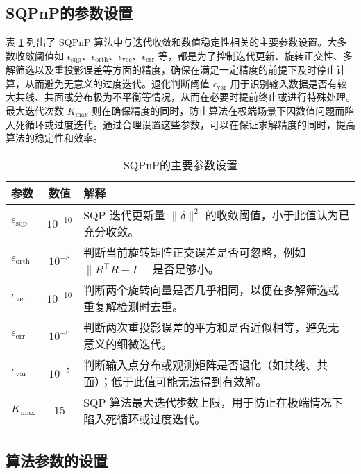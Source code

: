 \subsection{SQPnP的参数设置}
表 \ref{tab:sqpnp-params} 列出了 SQPnP 算法中与迭代收敛和数值稳定性相关的主要参数设置。大多数收敛阈值如 \(\epsilon_{\mathrm{sqp}}\)、\(\epsilon_{\mathrm{orth}}\)、\(\epsilon_{\mathrm{vec}}\)、\(\epsilon_{\mathrm{err}}\) 等，都是为了控制迭代更新、旋转正交性、多解筛选以及重投影误差等方面的精度，确保在满足一定精度的前提下及时停止计算，从而避免无意义的过度迭代。退化判断阈值 \(\epsilon_{\mathrm{var}}\) 用于识别输入数据是否有较大共线、共面或分布极为不平衡等情况，从而在必要时提前终止或进行特殊处理。最大迭代次数 \(K_{\mathrm{max}}\) 则在确保精度的同时，防止算法在极端场景下因数值问题而陷入死循环或过度迭代。通过合理设置这些参数，可以在保证求解精度的同时，提高算法的稳定性和效率。
\begin{table}[htbp]
	\centering
	\caption{SQPnP的主要参数设置}
	\label{tab:sqpnp-params}
	\begin{tabular}{l c p{7.5cm}}
		\toprule
		参数 & 数值 & 解释 \\
		\midrule
		
		$\epsilon_{\mathrm{sqp}}$      & $10^{-10}$ & 
		SQP 迭代更新量 $\|\delta\|^2$ 的收敛阈值，小于此值认为已充分收敛。\\[3pt]
		
		$\epsilon_{\mathrm{orth}}$     & $10^{-8}$  & 
		判断当前旋转矩阵正交误差是否可忽略，例如 $\|R^\top R - I\|$ 是否足够小。\\[3pt]
		
		$\epsilon_{\mathrm{vec}}$      & $10^{-10}$ &
		判断两个旋转向量是否几乎相同，以便在多解筛选或重复解检测时去重。\\[3pt]
		
		$\epsilon_{\mathrm{err}}$      & $10^{-6}$  &
		判断两次重投影误差的平方和是否近似相等，避免无意义的细微迭代。\\[3pt]
		
		$\epsilon_{\mathrm{var}}$      & $10^{-5}$  &
		判断输入点分布或观测矩阵是否退化（如共线、共面）；低于此值可能无法得到有效解。\\[3pt]
		
		$K_{\mathrm{max}}$             & 15         &
		SQP 算法最大迭代步数上限，用于防止在极端情况下陷入死循环或过度迭代。\\
		\bottomrule
	\end{tabular}
\end{table}


\subsection{算法参数的设置}



